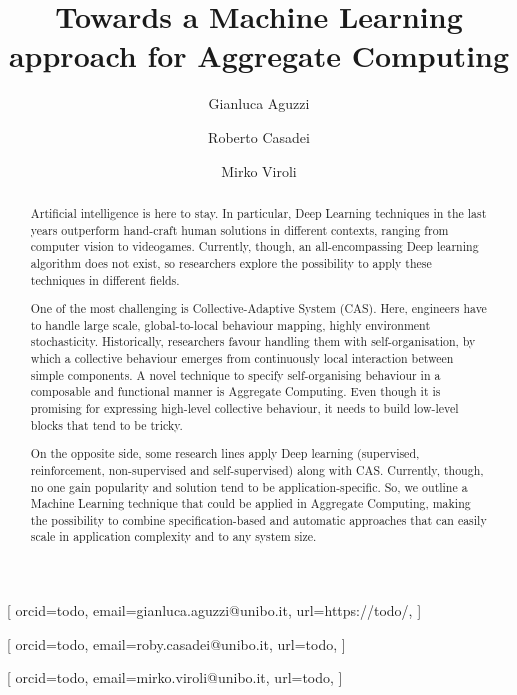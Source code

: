 \documentclass[
  twocolumn,
]{ceurart}
\begin{document}

\title{Towards a Machine Learning approach for Aggregate Computing} %

\author[1]{Gianluca Aguzzi}[%
 orcid=todo,
 email=gianluca.aguzzi@unibo.it,
 url=https://todo/,
]

\author[2]{Roberto Casadei}[%
 orcid=todo,
 email=roby.casadei@unibo.it,
 url=todo,
]

\author[2]{Mirko Viroli}[%
 orcid=todo,
 email=mirko.viroli@unibo.it,
 url=todo,
]
\address[1]{Alma Mater Studiorum - Università di Bologna, Cesena, Italy}
\newcommand{\constraints}[1]{\todo[inline, color=red]{#1}}
\newcommand{\suggestions}[1]{\todo[inline, color=yellow]{#1}}
\newcommand{\todos}[1]{\todo[inline, color=cyan]{#1}}
\newcommand{\outline}[1]{\todo[inline, color=green]{#1}}

\begin{abstract}
\suggestions{}
Artificial intelligence is here to stay. 
 In particular, Deep Learning techniques in the last years outperform 
 hand-craft human solutions in different contexts, ranging from computer vision to videogames.
%
Currently, though, an all-encompassing Deep learning algorithm does not exist, 
 so researchers explore the possibility to apply these techniques in different fields.

One of the most challenging is Collective-Adaptive System (CAS). %
 Here, engineers have to handle large scale, global-to-local behaviour mapping,
 highly environment stochasticity. 
%
Historically, researchers favour handling them with self-organisation,
 by which a collective behaviour emerges from continuously local interaction between simple components.
%
A novel technique to specify self-organising behaviour in a composable and functional manner is Aggregate Computing. 
 Even though it is promising for expressing high-level collective behaviour, 
 it needs to build low-level blocks that tend to be tricky. 

On the opposite side, some research lines apply Deep learning (supervised, reinforcement, non-supervised and self-supervised)
 along with CAS. Currently, though, no one gain popularity and solution tend to be application-specific.
%
So, we outline a Machine Learning technique that could be applied in Aggregate Computing, 
 making the possibility to combine specification-based and automatic approaches that can easily scale in application complexity and to any system size.
\end{abstract}
\end{document}
